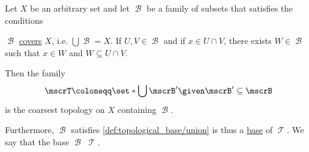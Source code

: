 \begin{proposition}\label{thm:topology_from_base}
  Let \( X \) be an arbitrary set and let \( \mscrB \) be a family of subsets that satisfies the conditions
  \begin{thmenum}
     \( \mscrB \) \hyperref[def:set_cover]{covers} \( X \), i.e. \( \bigcup \mscrB = X \).
     If \( U, V \in \mscrB \) and if \( x \in U \cap V \), there exists \( W \in \mscrB \) such that \( x \in W \) and \( W \subseteq U \cap V \).
  \end{thmenum}

  Then the family
  \begin{equation}\label{eq:thm:topology_from_base/topology}
    \mscrT \coloneqq \set*{ \bigcup \mscrB' \given \mscrB' \subseteq \mscrB }
  \end{equation}
  is the coarsest topology on \( X \) containing \( \mscrB \).

  Furthermore, \( \mscrB \) satisfies \cref{def:topological_base/union} is thus a \hyperref[def:topological_base]{base} of \( \mscrT \). We say that the base \( \mscrB \)  \( \mscrT \).
\end{proposition}

